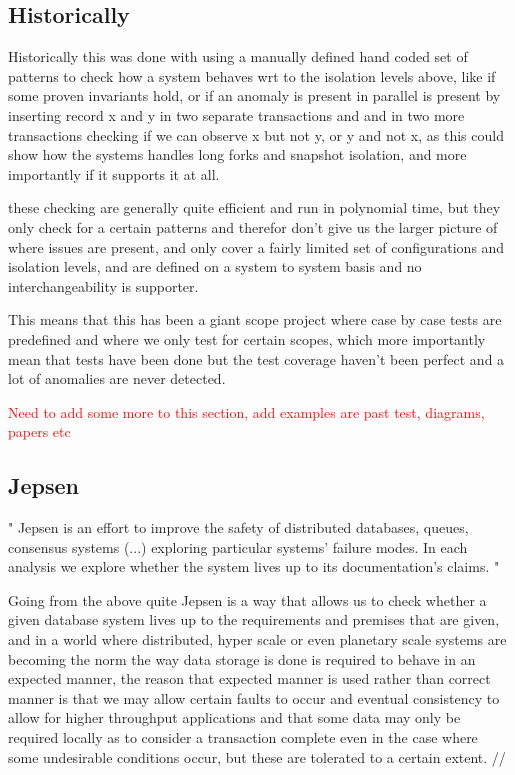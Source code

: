 \documentclass[a4paper,10pt,titlepage]{report}
\begin{document}
\subsection{Historically}

Historically this was done with using a manually defined hand coded set of patterns to check how a system behaves wrt to the isolation levels above, like if some proven invariants hold, or if an anomaly is present in parallel is present by inserting record x and y in two separate transactions and and in two more transactions checking if we can observe x but not y, or y and not x, as this could show how the systems handles long forks and snapshot isolation, and more importantly if it supports it at all.

these checking are generally quite efficient and run in polynomial time, but they only check for a certain patterns and therefor don't give us the larger picture of where issues are present, and only cover a fairly limited set of configurations and isolation levels, and are defined on a system to system basis and no interchangeability is supporter.

This means that this has been a giant scope project where case by case tests are predefined and where we only test for certain scopes, which more importantly mean that tests have been done but the test coverage haven't been perfect and a lot of anomalies are never detected.

\textcolor{red}{Need to add some more to this section, add examples are past test, diagrams, papers etc}

\subsection{Jepsen}
"
Jepsen is an effort to improve the safety of distributed databases, queues, consensus systems  (...) exploring particular systems’ failure modes. In each analysis we explore whether the system lives up to its documentation’s claims.
"\cite{jepsonio}
\\
\vspace{5mm}

Going from the above quite Jepsen is a way that allows us to check whether a given database system lives up to the requirements and premises that are given, and in a world where distributed, hyper scale or even planetary scale systems are becoming the norm the way data storage is done is required to behave in an expected manner, the reason that expected manner is used rather than correct manner is that we may allow certain faults to occur and eventual consistency to allow for higher throughput applications and that some data may only be required locally as to consider a transaction complete even in the case where some undesirable conditions occur, but these are tolerated to a certain extent. //
\end{document}
